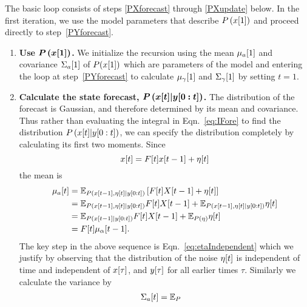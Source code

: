 The basic loop consists of steps \ref{PXforecast} through
\ref{PXupdate} below.  In the first iteration, we use the model
parameters that describe $P\left({x}{[1]} \right)$ and proceed
directly to step~\ref{PYforecast}.
\begin{enumerate}
\item \label{PX1} \textbf{Use $\bm{P\left({x}{[1]} \right)}$.}  We
  initialize the recursion using the mean ${\mu_a}{[1]}$ and
  covariance ${\Sigma_a}{[1]}$ of $P({x}{[1]})$ which are parameters
  of the model and entering the loop at step~\ref{PYforecast} to
  calculate ${\mu_\gamma}{[1]}$ and ${\Sigma_\gamma}{[1]}$ by
  setting $t=1$.
\item \label{PXforecast} \textbf{Calculate the state forecast,
    $\bm{P\left({x}{[t]}|y[0:t] \right)}$.}  The distribution
  of the forecast is Gaussian, and therefore determined by its mean
  and covariance.  Thus rather than evaluating the integral in
  Eqn.~\eqref{eq:IFore} to find the distribution
  $P\left({x}{[t]}|y[0:t] \right)$, we can specify the
  distribution completely by calculating its first two moments.  Since
  \begin{equation*}
    {x}{[t]} = {F}{[t]} {x}{[t-1]} + {\eta}{[t]}
  \end{equation*}
  the mean is
  \begin{align}
    {\mu_a}{[t]} &= \mathbb{E}_{P
      \left({x}{[t-1]},{\eta}{[t]}|y[0:t] \right)} \left[
      {F}{[t]}{X}{[t-1]} + {\eta}{[t]} \right] \nonumber \\
    &= \mathbb{E}_{P\left({x}{[t-1]},{\eta}{[t]}|y[0:t] \right)}
      {F}{[t]}{X}{[t-1]} +
      \mathbb{E}_{P\left({x}{[t-1]},{\eta}{[t]}|y[0:t] \right)} {\eta}{[t]} \nonumber \\
    \label{eq:etaIndependent}
    &= \mathbb{E}_{P \left({x}{[t-1]}|y[0:t] \right)}
    {F}{[t]}{X}{[t-1]}  + \mathbb{E}_{P (\eta)} {\eta}{[t]} \\
     &= {F}{[t]}{\mu_\alpha}{[t-1]}. \nonumber
   \end{align}
   The key step in the above sequence is
   Eqn.~\eqref{eq:etaIndependent} which we justify by observing that
   the distribution of the noise ${\eta}{[t]}$ is independent of time
   and independent of ${x}{[\tau]}$, and ${y}{[\tau]}$ for all
   earlier times $\tau$.  Similarly we calculate the
   variance by
   \begin{align}
     {\Sigma_a}{[t]} &= \mathbb{E}_{P
}
\end{align}
\end{enumerate}
